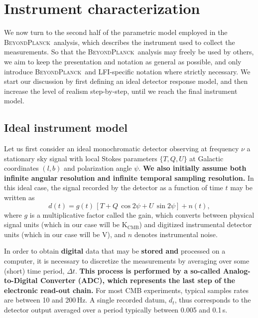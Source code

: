 \documentclass[twocolumn]{aa}
\newcommand{\BP}{\textsc{BeyondPlanck}}
\begin{document}
\section{Instrument characterization}
\label{sec:instrument}

We now turn to the second half of the parametric model
employed in the \BP\ analysis, which describes the instrument used to
collect the measurements. So that the \BP\ analysis may freely be used by
others, we aim to
keep the presentation and notation as general as possible, and only
introduce \BP\ and LFI-specific notation where strictly necessary. We
start our discussion by first defining an ideal detector response
model, and then increase the level of realism step-by-step, until we
reach the final instrument model.

\subsection{Ideal instrument model}
\label{sec:ideal_model}

Let us first consider an ideal monochromatic detector observing at
frequency $\nu$ a stationary sky signal with local Stokes parameters
$\{T,Q,U\}$ at Galactic coordinates $(l,b)$ and polarization angle
$\psi$.  {\bf We also initially assume both infinite angular resolution and
infinite temporal sampling resolution.} In this ideal case, the signal recorded by
the detector as a function of time $t$ may be written as
\begin{equation}
  d(t) = g(t)\,\left[T + Q\,\cos2\psi + U\,\sin2\psi\right]
  + n(t),
  \label{eq:ideal_model}
\end{equation}
where $g$ is a multiplicative factor called the gain, which converts
between physical signal units (which in our case will be
$\mathrm{K}_{\mathrm{CMB}}$) and digitized instrumental detector units
(which in our case will be V), and $n$ denotes instrumental
noise.

In order to obtain {\bf digital} data that may be {\bf stored and} processed on a computer, it is
necessary to discretize the measurements by averaging over some
(short) time period, $\Delta t$. {\bf This process is performed by a so-called Analog-to-Digital
  Converter (ADC), which represents the last step of the electronic
  read-out chain.} For most CMB experiments, typical
samples rates are between 10 and 200\,Hz. A single recorded datum,
$d_t$, thus corresponds to the detector output averaged over a period 
typically between 0.005 and 0.1\,s.
\end{document}
